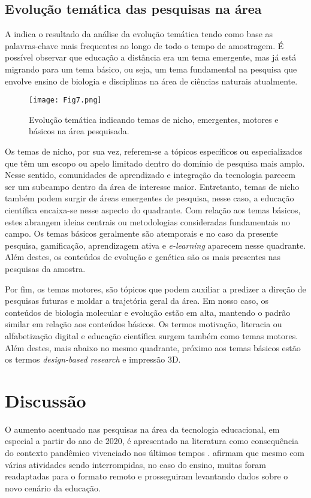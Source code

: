 \documentclass[portuguese]{textolivre}
\begin{document}
\subsection{Evolução temática das pesquisas na área}

A  indica o resultado da análise da evolução temática tendo como base as palavras-chave mais frequentes ao longo de todo o tempo de amostragem. É possível observar que educação a distância era um tema emergente, mas já está migrando para um tema básico, ou seja, um tema fundamental na pesquisa que envolve ensino de biologia e disciplinas na área de ciências naturais atualmente.

\begin{figure}[h!]
    \centering
    \texttt{[image: Fig7.png]}
    \caption{Evolução temática indicando temas de nicho, emergentes, motores e básicos na área pesquisada.}
    \label{fig7}
\end{figure}

Os temas de nicho, por sua vez, referem-se a tópicos específicos ou especializados que têm um escopo ou apelo limitado dentro do domínio de pesquisa mais amplo. Nesse sentido, comunidades de aprendizado e integração da tecnologia parecem ser um subcampo dentro da área de interesse maior. Entretanto, temas de nicho também podem surgir de áreas emergentes de pesquisa, nesse caso, a educação científica encaixa-se nesse aspecto do quadrante.
Com relação aos temas básicos, estes abrangem ideias centrais ou metodologias consideradas fundamentais no campo. Os temas básicos geralmente são atemporais e no caso da presente pesquisa, gamificação, aprendizagem ativa e \textit{e-learning} aparecem nesse quadrante. Além destes, os conteúdos de evolução e genética são os mais presentes nas pesquisas da amostra.

Por fim, os temas motores, são tópicos que podem auxiliar a predizer a direção de pesquisas futuras e moldar a trajetória geral da área. Em nosso caso, os conteúdos de biologia molecular e evolução estão em alta, mantendo o padrão similar em relação aos conteúdos básicos. Os termos motivação, literacia ou alfabetização digital e educação científica surgem também como temas motores. Além destes, mais abaixo no mesmo quadrante, próximo aos temas básicos estão os termos \textit{design-based research} e impressão 3D.

\section{Discussão}
O aumento acentuado nas pesquisas na área da tecnologia educacional, em especial a partir do ano de 2020, é apresentado na literatura como consequência do contexto pandêmico vivenciado nos últimos tempos \cite{ibanez_educacion_2020}. \textcite{garcia_percepcao_2022} afirmam que mesmo com várias atividades sendo interrompidas, no caso do ensino, muitas foram readaptadas para o formato remoto e prosseguiram levantando dados sobre o novo cenário da educação.
\end{document}
